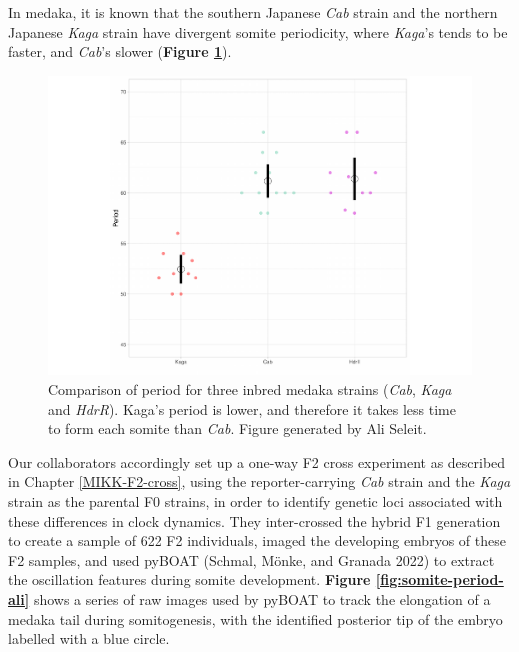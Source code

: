 \documentclass[
]{book}
\begin{document}
In medaka, it is known that the southern Japanese \emph{Cab} strain and the northern Japanese \emph{Kaga} strain have divergent somite periodicity, where \emph{Kaga}'s tends to be faster, and \emph{Cab}'s slower (\textbf{Figure \ref{fig:F0-Cab-Kaga-HdrR}}).



\begin{figure}
\includegraphics[width=1\linewidth]{figs/somites/ali_period_F0_Cab_Kaga} \caption{Comparison of period for three inbred medaka strains (\emph{Cab}, \emph{Kaga} and \emph{HdrR}). Kaga's period is lower, and therefore it takes less time to form each somite than \emph{Cab}. Figure generated by Ali Seleit.}\label{fig:F0-Cab-Kaga-HdrR}
\end{figure}

Our collaborators accordingly set up a one-way F2 cross experiment as described in Chapter \ref{MIKK-F2-cross}, using the reporter-carrying \emph{Cab} strain and the \emph{Kaga} strain as the parental F0 strains, in order to identify genetic loci associated with these differences in clock dynamics. They inter-crossed the hybrid F1 generation to create a sample of 622 F2 individuals, imaged the developing embryos of these F2 samples, and used pyBOAT (Schmal, Mönke, and Granada 2022) to extract the oscillation features during somite development. \textbf{Figure \ref{fig:somite-period-ali}} shows a series of raw images used by pyBOAT to track the elongation of a medaka tail during somitogenesis, with the identified posterior tip of the embryo labelled with a blue circle.
\end{document}
